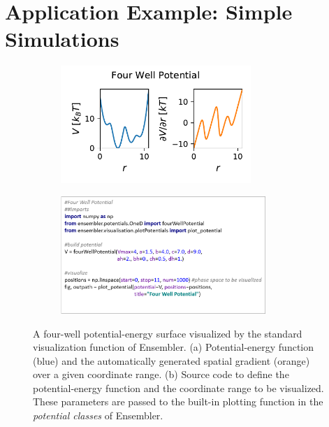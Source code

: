 \section{Application Example: Simple Simulations}



\begin{figure}[H]
	\centering
	\begin{subfigure}{0.45\textwidth}
		\includegraphics[width=\linewidth, height=1.75in]{fig/codeExamples/four_well.pdf} 
		\caption{}
	\end{subfigure}
	\begin{subfigure}{0.45\textwidth}
		\includegraphics[width=\linewidth, height=1.75in]{fig/codeExamples/Potential_code.png}
		\caption{}
	\end{subfigure}
	\caption{A four-well potential-energy surface visualized by the standard visualization function of Ensembler. (a) Potential-energy function (blue) and the automatically generated spatial gradient (orange) over a given coordinate range. (b) Source code to define the potential-energy function and the coordinate range to be visualized. These parameters are passed to the built-in plotting function in the \textit{potential classes} of Ensembler.}
	\label{fig:code_example_potential}
\end{figure}



